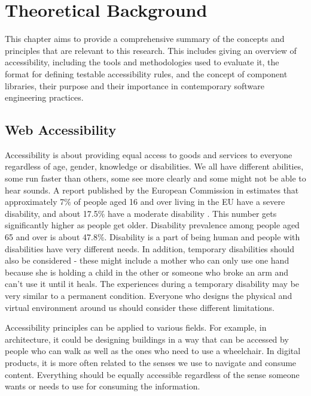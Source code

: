 \documentclass{master_thesis}
\begin{document}
\section{Theoretical Background}\label{chap:background}

This chapter aims to provide a comprehensive summary of the concepts and principles that are relevant to this research. This includes giving an overview of accessibility, including the tools and methodologies used to evaluate it, the format for defining testable accessibility rules, and the concept of component libraries, their purpose and their importance in contemporary software engineering practices.

\subsection{Web Accessibility}

Accessibility is about providing equal access to goods and services to everyone regardless of age, gender, knowledge or disabilities. We all have different abilities, some run faster than others, some see more clearly and some might not be able to hear sounds. A report published by the European Commission in \citeyear{Grammenos2020} estimates that approximately 7\% of people aged 16 and over living in the EU have a severe disability, and about 17.5\% have a moderate disability \citep{Grammenos2020}. This number gets significantly higher as people get older. Disability prevalence among people aged 65 and over is about 47.8\%.  Disability is a part of being human and people with disabilities have very different needs. In addition, temporary disabilities should also be considered - these might include a mother who can only use one hand because she is holding a child in the other or someone who broke an arm and can't use it until it heals. The experiences during a temporary disability may be very similar to a permanent condition. Everyone who designs the physical and virtual environment around us should consider these different limitations.

Accessibility principles can be applied to various fields. For example, in architecture, it could be designing buildings in a way that can be accessed by people who can walk as well as the ones who need to use a wheelchair. In digital products, it is more often related to the senses we use to navigate and consume content. Everything should be equally accessible regardless of the sense someone wants or needs to use for consuming the information.
\end{document}
